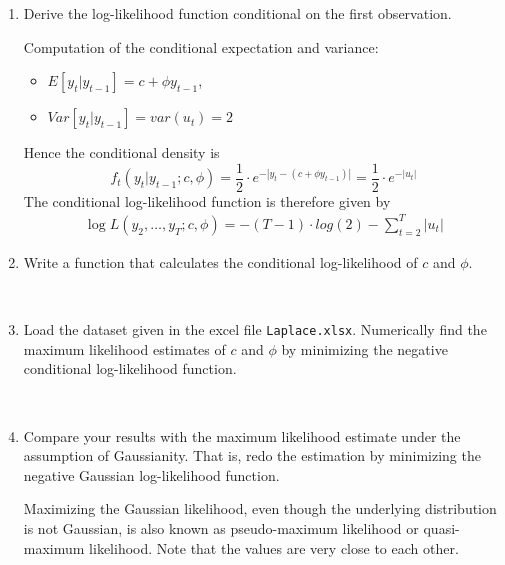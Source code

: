 \documentclass[a4paper]{scrartcl}
\begin{document}
\begin{enumerate}
	\item Derive the log-likelihood function conditional on the first observation.
	\begin{solution}
		Computation of the conditional expectation and variance:
		\begin{itemize}
			\item $E[y_{t}|y_{t-1}] = 
			c + \phi y_{t-1} $,
			\item $Var[y_{t}|y_{t-1}] = var(u_t) = 2$ 
		\end{itemize}
		Hence the conditional density is
		\begin{displaymath}
		f_t(y_{t}|y_{t-1}; c, \phi) = \frac{1}{2} \cdot e^{-|y_{t} -(c + \phi y_{t-1})|} = \frac{1}{2} \cdot e^{-|u_t|}
		\end{displaymath}
		The conditional log-likelihood function is therefore given by
		\begin{eqnarray*}
			\log L(y_{2}, \dots, y_{T};c, \phi) 
			=-(T-1) \cdot log(2) - \sum_{t=2}^{T} |u_{t}|
		\end{eqnarray*}
	\end{solution}
	\item Write a function that calculates the conditional log-likelihood of $c$ and $\phi$.
	\begin{solution}~
		
	\end{solution}	
	\item Load the dataset given in the excel file \texttt{Laplace.xlsx}. Numerically find the maximum likelihood estimates of $c$ and $\phi$ by minimizing the negative conditional log-likelihood function.
	\begin{solution}~
	\end{solution}
	
	\item Compare your results with the maximum likelihood estimate under the assumption of Gaussianity. That is, redo the estimation by minimizing the negative Gaussian log-likelihood function.
	\begin{solution}
		Maximizing the Gaussian likelihood, even though the underlying distribution is not Gaussian, is also known as pseudo-maximum likelihood or quasi-maximum likelihood. Note that the values are very close to each other.
\newpage %
	\end{solution}
	
\end{enumerate}
\newpage
\end{document}
